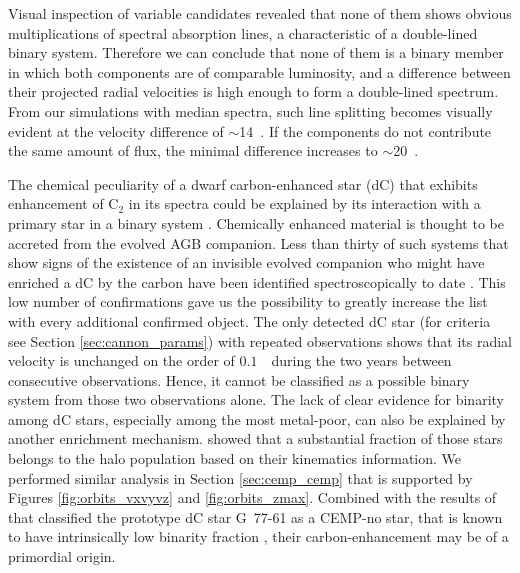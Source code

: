 Visual inspection of variable candidates revealed that none of them shows obvious multiplications of spectral absorption lines, a characteristic of a double-lined binary system. Therefore we can conclude that none of them is a binary member in which both components are of comparable luminosity, and a difference between their projected radial velocities is high enough to form a double-lined spectrum. From our simulations with median spectra, such line splitting becomes visually evident at the velocity difference of $\sim$14~\kms. If the components do not contribute the same amount of flux, the minimal difference increases to $\sim$20~\kms.

The chemical peculiarity of a dwarf carbon-enhanced star (dC) that exhibits enhancement of C$_2$ in its spectra could be explained by its interaction with a primary star in a binary system \cite{2018ApJ...856L...2M}. Chemically enhanced material is thought to be accreted from the evolved AGB companion. Less than thirty of such systems that show signs of the existence of an invisible evolved companion who might have enriched a dC by the carbon have been identified spectroscopically to date \cite{1986ApJ...300..314D, 2018ApJ...856L...2M, 2018MNRAS.479.3873W}. This low number of confirmations gave us the possibility to greatly increase the list with every additional confirmed object. The only detected dC star (for criteria see Section \ref{sec:cannon_params}) with repeated observations shows that its radial velocity is unchanged on the order of $0.1$~\kms\ during the two years between consecutive observations. Hence, it cannot be classified as a possible binary system from those two observations alone. The lack of clear evidence for binarity among dC stars, especially among the most metal-poor, can also be explained by another enrichment mechanism. \citet{2018MNRAS.477.3801F} showed that a substantial fraction of those stars belongs to the halo population based on their kinematics information. We performed similar analysis in Section \ref{sec:cemp_cemp} that is supported by Figures \ref{fig:orbits_vxvyvz} and \ref{fig:orbits_zmax}. Combined with the results of \citet{2016ApJ...833...20Y} that classified the prototype dC star \mbox{G 77-61} as a CEMP-no star, that is known to have intrinsically low binarity fraction \cite{2014MNRAS.441.1217S, 2016A&A...586A.160H}, their carbon-enhancement may be of a primordial origin.

